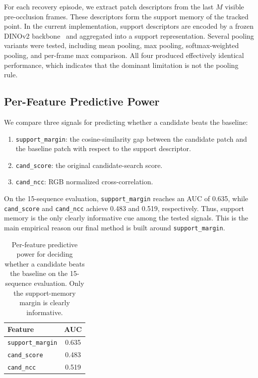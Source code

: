 \documentclass[10pt,journal,compsoc]{IEEEtran}
\newcommand{\supportmargin}{\texttt{support\_margin}}
\newcommand{\candscore}{\texttt{cand\_score}}
\begin{document}
For each recovery episode, we extract patch descriptors from the last $M$ visible pre-occlusion frames. These descriptors form the support memory of the tracked point. In the current implementation, support descriptors are encoded by a frozen DINOv2 backbone~\cite{oquab2023dinov2} and aggregated into a support representation. Several pooling variants were tested, including mean pooling, max pooling, softmax-weighted pooling, and per-frame max comparison. All four produced effectively identical performance, which indicates that the dominant limitation is not the pooling rule.

\subsection{Per-Feature Predictive Power}

We compare three signals for predicting whether a candidate beats the baseline:
\begin{enumerate}[leftmargin=1.5em]
    \item \supportmargin: the cosine-similarity gap between the candidate patch and the baseline patch with respect to the support descriptor.
    \item \candscore: the original candidate-search score.
    \item \texttt{cand\_ncc}: RGB normalized cross-correlation.
\end{enumerate}

On the 15-sequence evaluation, \supportmargin{} reaches an AUC of 0.635, while \candscore{} and \texttt{cand\_ncc} achieve 0.483 and 0.519, respectively. Thus, support memory is the only clearly informative cue among the tested signals. This is the main empirical reason our final method is built around \supportmargin.

\begin{table}[t]
    \centering
    \caption{Per-feature predictive power for deciding whether a candidate beats the baseline on the 15-sequence evaluation. Only the support-memory margin is clearly informative.}
    \label{tab:feature_auc}
    \setlength{\tabcolsep}{6pt}
    \begin{tabular}{lc}
        \toprule
        Feature & AUC \\
        \midrule
        \supportmargin{} & 0.635 \\
        \candscore{} & 0.483 \\
        \texttt{cand\_ncc} & 0.519 \\
        \bottomrule
    \end{tabular}
\end{table}
\end{document}
